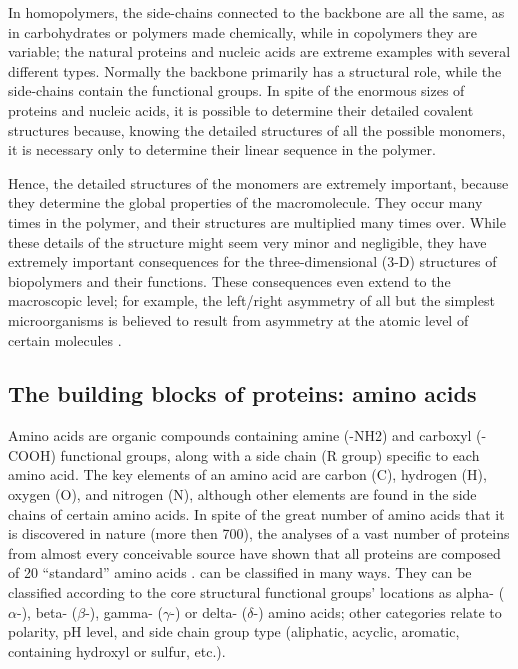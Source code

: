 In homopolymers, the side-chains connected to the backbone are all the same, as in carbohydrates or polymers made chemically, while in copolymers they are variable; the natural proteins and nucleic acids are extreme examples with several different types. Normally the backbone primarily has a structural role, while the side-chains contain the functional groups. In spite of the enormous sizes of proteins and nucleic acids, it is possible to determine their detailed covalent structures because, knowing the detailed structures of all the possible monomers, it is necessary only to determine their linear sequence in the polymer.

Hence, the detailed structures of the monomers are extremely important, because they determine the global properties of the macromolecule. They occur many times in the polymer, and their structures are multiplied many times over. While these details of the structure might seem very minor and negligible, they have extremely important consequences for the three-dimensional (3-D) structures of biopolymers and their functions. These consequences even extend to the macroscopic level; for example, the left/right asymmetry of all but the simplest microorganisms is believed to result from asymmetry at the atomic level of certain molecules
\cite{creighton2010biophysical}.


\subsection{The building blocks of proteins: amino acids}\label{ssec:amino-acids}
Amino acids are organic compounds containing amine (-NH2) and carboxyl (-COOH) functional groups, along with a side chain (R group) specific to each amino acid. The key elements of an amino acid are carbon (C), hydrogen (H), oxygen (O), and nitrogen (N), although other elements are found in the side chains of certain amino acids. In spite of the great number of amino acids that it is discovered in nature (more then 700), the analyses of a vast number of proteins from almost every conceivable source have shown that all proteins are composed of 20 ``standard'' amino acids
\cite{wu2013amino}. can be classified in many ways. They can be classified according to the core structural functional groups' locations as alpha- ($\alpha$-), beta- ($\beta$-), gamma- ($\gamma$-) or delta- ($\delta$-) amino acids; other categories relate to polarity, pH level, and side chain group type (aliphatic, acyclic, aromatic, containing hydroxyl or sulfur, etc.). 

